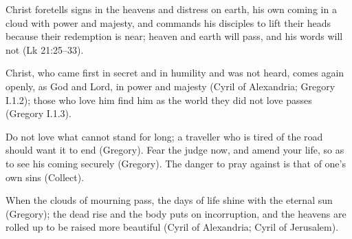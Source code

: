 \begin{fourSenses}
\item[Literal.] Christ foretells signs in the heavens and distress on earth,
his own coming in a cloud with power and majesty, and commands his disciples
to lift their heads because their redemption is near; heaven and earth will
pass, and his words will not (Lk 21:25--33).
\item[Allegorical.] Christ, who came first in secret and in humility and was
not heard, comes again openly, as God and Lord, in power and majesty (Cyril of
Alexandria; Gregory I.1.2); those who love him find him as the world they did
not love passes (Gregory I.1.3).
\item[Moral.] Do not love what cannot stand for long; a traveller who is
tired of the road should want it to end (Gregory). Fear the judge now, and
amend your life, so as to see his coming securely (Gregory). The danger to
pray against is that of one's own sins (Collect).
\item[Anagogical.] When the clouds of mourning pass, the days of life shine
with the eternal sun (Gregory); the dead rise and the body puts on
incorruption, and the heavens are rolled up to be raised more beautiful
(Cyril of Alexandria; Cyril of Jerusalem).
\end{fourSenses}

